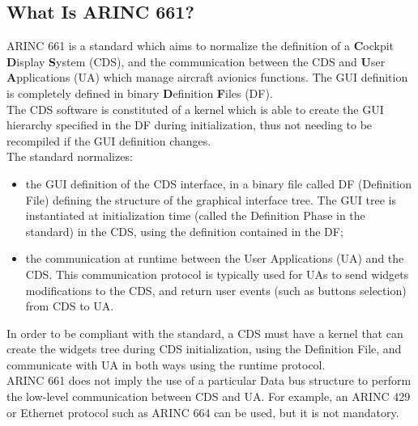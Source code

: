     \subsection{What Is ARINC 661?}
        ARINC 661 is a standard which aims to normalize the definition of a \textbf{C}ockpit \textbf{D}isplay \textbf{S}ystem (CDS), 
        and the communication between the CDS and \textbf{U}ser \textbf{A}pplications (UA) which manage aircraft avionics functions. The GUI definition 
        is completely defined in binary \textbf{D}efinition \textbf{F}iles (DF).\\
        \vspace{3mm}
        The CDS software is constituted of a kernel which is able to create the GUI hierarchy specified in the DF during initialization, 
        thus not needing to be recompiled if the GUI definition changes. \\
        \vspace{3mm}
        The standard normalizes: 
        \begin{itemize}
            \item the GUI definition of the CDS interface, in a binary file called DF (Definition File) defining the structure of the 
            graphical interface tree. The GUI tree is instantiated at initialization time (called the Definition Phase in the standard) 
            in the CDS, using the definition contained in the DF;
            \item the communication at runtime between the User Applications (UA) and the CDS. This communication protocol is typically 
            used for UAs to send widgets modifications to the CDS, and return user events (such as buttons selection) from CDS to UA.
        \end{itemize}
        In order to be compliant with the standard, a CDS must have a kernel that can create the widgets tree during CDS initialization, 
        using the Definition File, and communicate with UA in both ways using the runtime protocol. \\ 
        \vspace{3mm}
        ARINC 661 does not imply the use of a particular Data bus structure to perform the low-level communication between CDS and UA. 
        For example, an ARINC 429 or Ethernet protocol such as ARINC 664 can be used, but it is not mandatory. \\ 
